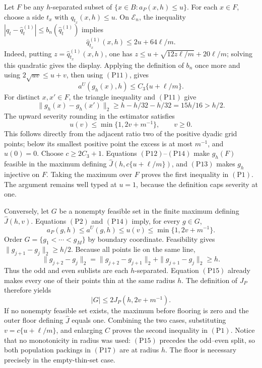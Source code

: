 Let \(F\) be any \(h\)-separated subset of
\(\{x\in B:a_P(x,h)\leq u\}\).  For each \(x\in F\), choose a side
\(t_x\) with \(q_{t_x}(x,h)\leq u\).  On \(\mathcal E_n\), the inequality
\(|q_t-\widehat q_t^{(1)}|\leq b_n(\widehat q_t^{(1)})\) implies
\[
 \widehat q_{t_x}^{(1)}(x,h)\leq2u+64\ell/m.
\]
Indeed, putting \(z=\widehat q_{t_x}^{(1)}(x,h)\), one has
\(z\leq u+\sqrt{12z\ell/m}+20\ell/m\); solving this quadratic gives the
display.  Applying the definition of \(b_n\) once more and using
\(2\sqrt{uv}\leq u+v\), then using \((\mathrm{P11})\), gives
\[
 a^U(g_h(x),h)\leq C_3\{u+\ell/m\}.                               \tag{P12}
\]
For distinct \(x,x'\in F\), the triangle inequality and
\((\mathrm{P11})\) give
\[
 \|g_h(x)-g_h(x')\|_2
 \geq h-h/32-h/32=15h/16>h/2.                                    \tag{P13}
\]
The upward severity rounding in the estimator satisfies
\[
 u(v)\leq\min\{1,2v+m^{-1}\},\qquad v\geq0.                       \tag{P14}
\]
This follows directly from the adjacent ratio two of the positive dyadic
grid points; below its smallest positive point the excess is at most
\(m^{-1}\), and \(u(0)=0\).  Choose \(c\geq2C_3+1\).  Equations
\((\mathrm{P12})\)--\((\mathrm{P14})\) make \(g_h(F)\) feasible in the
maximum defining \(\widehat J(h,c\{u+\ell/m\})\), and
\((\mathrm{P13})\) makes \(g_h\) injective on \(F\).  Taking the maximum
over \(F\) proves the first inequality in \((\mathrm{P1})\).  The argument
remains well typed at \(u=1\), because the definition caps severity at one.

Conversely, let \(G\) be a nonempty feasible set in the finite maximum
defining \(\widehat J(h,v)\).  Equations \((\mathrm{P2})\) and
\((\mathrm{P14})\) imply, for every \(g\in G\),
\[
 a_P(g,h)\leq a^U(g,h)\leq u(v)
 \leq\min\{1,2v+m^{-1}\}.                                        \tag{P15}
\]
Order \(G=\{g_1<\cdots<g_M\}\) by boundary coordinate.  Feasibility gives
\(\|g_{j+1}-g_j\|_2\geq h/2\).  Because all points lie on the same line,
\[
 \|g_{j+2}-g_j\|_2
 =\|g_{j+2}-g_{j+1}\|_2+\|g_{j+1}-g_j\|_2\geq h.                 \tag{P16}
\]
Thus the odd and even sublists are each \(h\)-separated.  Equation
\((\mathrm{P15})\) already makes every one of their points thin at the same
radius \(h\).  The definition of \(J_P\) therefore yields
\[
 |G|\leq2J_P(h,2v+m^{-1}).                                        \tag{P17}
\]
If no nonempty feasible set exists, the maximum before flooring is zero and
the outer floor defining \(\widehat J\) equals one.  Combining the two cases,
substituting \(v=c\{u+\ell/m\}\), and enlarging \(C\) proves the second
inequality in \((\mathrm{P1})\).  Notice that no monotonicity in radius was
used: \((\mathrm{P15})\) precedes the odd--even split, so both population
packings in \((\mathrm{P17})\) are at radius \(h\).  The floor is necessary
precisely in the empty-thin-set case.

